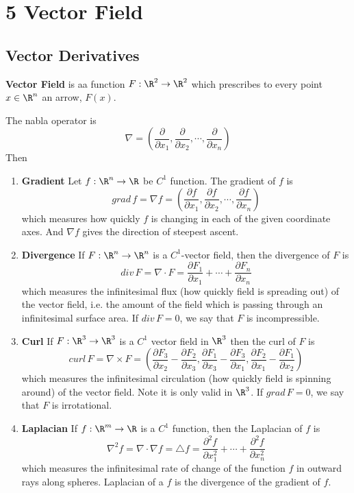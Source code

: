 \documentclass[11pt]{article}
\begin{document}
\section*{5 Vector Field}

\subsection*{Vector Derivatives}


\begin{defn*}
  \textbf{Vector Field} is aa function $F: \R^2 \to \R^2$ which prescribes to every point $x\in \R^n$ an arrow, $F(x)$.
\end{defn*}

\begin{defn*}
  The nabla operator is
  \[
    \nabla = \left(\frac{\partial}{\partial x_1}, \frac{\partial}{\partial x_2}, \cdots, \frac{\partial}{\partial x_n}\right)
  \]
  Then
  \begin{enumerate}
    \item \textbf{Gradient} Let $f:\R^n\to\R$ be $C^1$ function. The gradient of $f$ is
    \[
      grad\, f = \nabla f = \left(\frac{\partial f}{\partial x_1}, \frac{\partial f}{\partial x_2}, \cdots, \frac{\partial f}{\partial x_n}\right)
    \]
    which measures how quickly $f$ is changing in each of the given coordinate axes. And $\nabla f$ gives the direction of steepest ascent.
    \item \textbf{Divergence} If $F:\R^n \to \R^n$ is a $C^1$-vector field, then the divergence of $F$ is
    \[
      div\, F = \nabla \cdot F = \frac{\partial F_1}{\partial x_1} + \cdots + \frac{\partial F_n}{\partial x_n}
    \]
    which measures the infinitesimal flux (how quickly field is spreading out) of the vector field, i.e. the amount of the field which is passing through an infinitesimal surface area. If $div\, F = 0$, we say that $F$ is incompressible.
    \item \textbf{Curl} If $F:\R^3 \to \R^3$ is a $C^1$ vector field in $\R^3$ then the curl of $F$ is
    \[
      curl\, F = \nabla \times F = \left( \frac{\partial F_3}{\partial x_2} - \frac{\partial F_2}{\partial x_3}, \frac{\partial F_1}{\partial x_3} - \frac{\partial F_3}{\partial x_1}, \frac{\partial F_2}{\partial x_1} - \frac{\partial F_1}{\partial x_2} \right)
    \]
    which measures the infinitesimal circulation (how quickly field is spinning around) of the vector field. Note it is only valid in $\R^3$. If $grad\, F = 0$, we say that $F$ is irrotational.
    \item \textbf{Laplacian} If $f:\R^m \to \R$ is a $C^1$ function, then the Laplacian of $f$ is
    \[
      \nabla^2 f = \nabla \cdot \nabla f = \triangle f = \frac{\partial^2 f}{\partial x_1^2} + \cdots + \frac{\partial^2 f}{\partial x_n^2}
    \]
    which measures the infinitesimal rate of change of the function $f$ in outward rays along spheres. Laplacian of a $f$ is the divergence of the gradient of $f$.
  \end{enumerate}
\end{defn*}
\end{document}
